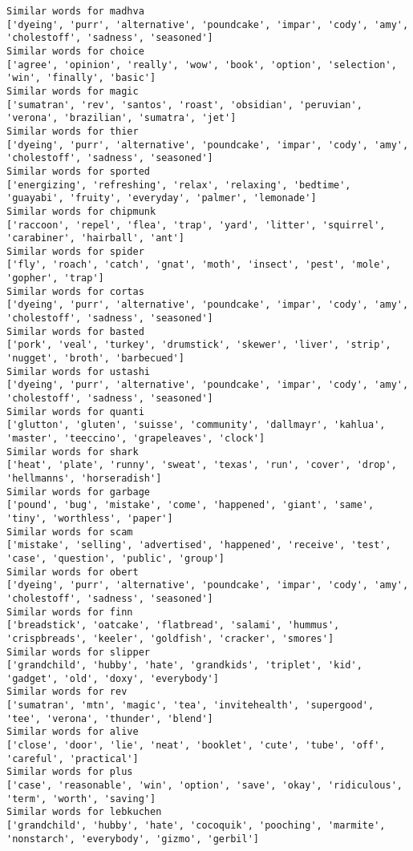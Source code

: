 \documentclass[11pt]{article}
\begin{document}
\begin{Verbatim}[commandchars=\\\{\}]
Similar words for madhva
['dyeing', 'purr', 'alternative', 'poundcake', 'impar', 'cody', 'amy', 'cholestoff', 'sadness', 'seasoned']
Similar words for choice
['agree', 'opinion', 'really', 'wow', 'book', 'option', 'selection', 'win', 'finally', 'basic']
Similar words for magic
['sumatran', 'rev', 'santos', 'roast', 'obsidian', 'peruvian', 'verona', 'brazilian', 'sumatra', 'jet']
Similar words for thier
['dyeing', 'purr', 'alternative', 'poundcake', 'impar', 'cody', 'amy', 'cholestoff', 'sadness', 'seasoned']
Similar words for sported
['energizing', 'refreshing', 'relax', 'relaxing', 'bedtime', 'guayabi', 'fruity', 'everyday', 'palmer', 'lemonade']
Similar words for chipmunk
['raccoon', 'repel', 'flea', 'trap', 'yard', 'litter', 'squirrel', 'carabiner', 'hairball', 'ant']
Similar words for spider
['fly', 'roach', 'catch', 'gnat', 'moth', 'insect', 'pest', 'mole', 'gopher', 'trap']
Similar words for cortas
['dyeing', 'purr', 'alternative', 'poundcake', 'impar', 'cody', 'amy', 'cholestoff', 'sadness', 'seasoned']
Similar words for basted
['pork', 'veal', 'turkey', 'drumstick', 'skewer', 'liver', 'strip', 'nugget', 'broth', 'barbecued']
Similar words for ustashi
['dyeing', 'purr', 'alternative', 'poundcake', 'impar', 'cody', 'amy', 'cholestoff', 'sadness', 'seasoned']
Similar words for quanti
['glutton', 'gluten', 'suisse', 'community', 'dallmayr', 'kahlua', 'master', 'teeccino', 'grapeleaves', 'clock']
Similar words for shark
['heat', 'plate', 'runny', 'sweat', 'texas', 'run', 'cover', 'drop', 'hellmanns', 'horseradish']
Similar words for garbage
['pound', 'bug', 'mistake', 'come', 'happened', 'giant', 'same', 'tiny', 'worthless', 'paper']
Similar words for scam
['mistake', 'selling', 'advertised', 'happened', 'receive', 'test', 'case', 'question', 'public', 'group']
Similar words for obert
['dyeing', 'purr', 'alternative', 'poundcake', 'impar', 'cody', 'amy', 'cholestoff', 'sadness', 'seasoned']
Similar words for finn
['breadstick', 'oatcake', 'flatbread', 'salami', 'hummus', 'crispbreads', 'keeler', 'goldfish', 'cracker', 'smores']
Similar words for slipper
['grandchild', 'hubby', 'hate', 'grandkids', 'triplet', 'kid', 'gadget', 'old', 'doxy', 'everybody']
Similar words for rev
['sumatran', 'mtn', 'magic', 'tea', 'invitehealth', 'supergood', 'tee', 'verona', 'thunder', 'blend']
Similar words for alive
['close', 'door', 'lie', 'neat', 'booklet', 'cute', 'tube', 'off', 'careful', 'practical']
Similar words for plus
['case', 'reasonable', 'win', 'option', 'save', 'okay', 'ridiculous', 'term', 'worth', 'saving']
Similar words for lebkuchen
['grandchild', 'hubby', 'hate', 'cocoquik', 'pooching', 'marmite', 'nonstarch', 'everybody', 'gizmo', 'gerbil']

\end{Verbatim}
\end{document}
